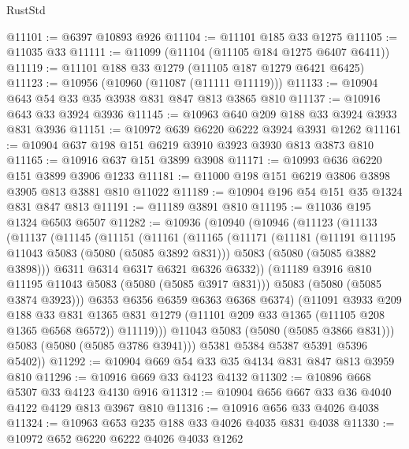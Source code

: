 \begin{lexlean}{RustStd}
\begin{coremodule}
{\begin{coremodule}
{{{{{@11101 := @6397 @10893 @926
@11104 := @11101 @185 @33 @1275
@11105 := @11035 @33
@11111 := @11099 (@11104 (@11105 @184 @1275 @6407 @6411))
@11119 := @11101 @188 @33 @1279 (@11105 @187 @1279 @6421 @6425)
@11123 := @10956 (@10960 (@11087 (@11111 @11119)))
@11133 := @10904 @643 @54 @33 @35 @3938 @831 @847 @813 @3865 @810
@11137 := @10916 @643 @33 @3924 @3936
@11145 := @10963 @640 @209 @188 @33 @3924 @3933 @831 @3936
@11151 := @10972 @639 @6220 @6222 @3924 @3931 @1262
@11161 := @10904 @637 @198 @151 @6219 @3910 @3923 @3930 @813 @3873 @810
@11165 := @10916 @637 @151 @3899 @3908
@11171 := @10993 @636 @6220 @151 @3899 @3906 @1233
@11181 := @11000 @198 @151 @6219 @3806 @3898 @3905 @813 @3881 @810 @11022
@11189 := @10904 @196 @54 @151 @35 @1324 @831 @847 @813
@11191 := @11189 @3891 @810
@11195 := @11036 @195 @1324 @6503 @6507
@11282 := @10936
    (@10940
      (@10946
        (@11123
          (@11133
            (@11137
              (@11145
                (@11151
                  (@11161
                    (@11165
                      (@11171
                        (@11181
                          (@11191 @11195 @11043 @5083 (@5080 (@5085 @3892 @831)))
                          @5083
                          (@5080 (@5085 @3882 @3898)))
                        @6311
                        @6314
                        @6317
                        @6321
                        @6326
                        @6332))
                    (@11189 @3916 @810 @11195 @11043 @5083 (@5080 (@5085 @3917 @831)))
                    @5083
                    (@5080 (@5085 @3874 @3923)))
                  @6353
                  @6356
                  @6359
                  @6363
                  @6368
                  @6374)
                (@11091
                  @3933
                  @209
                  @188
                  @33
                  @831
                  @1365
                  @831
                  @1279
                  (@11101 @209 @33 @1365 (@11105 @208 @1365 @6568 @6572))
                  @11119)))
            @11043
            @5083
            (@5080 (@5085 @3866 @831)))
          @5083
          (@5080 (@5085 @3786 @3941)))
        @5381
        @5384
        @5387
        @5391
        @5396
        @5402))
@11292 := @10904 @669 @54 @33 @35 @4134 @831 @847 @813 @3959 @810
@11296 := @10916 @669 @33 @4123 @4132
@11302 := @10896 @668 @5307 @33 @4123 @4130 @916
@11312 := @10904 @656 @667 @33 @36 @4040 @4122 @4129 @813 @3967 @810
@11316 := @10916 @656 @33 @4026 @4038
@11324 := @10963 @653 @235 @188 @33 @4026 @4035 @831 @4038
@11330 := @10972 @652 @6220 @6222 @4026 @4033 @1262
}}}}}
\end{coremodule}}
\end{coremodule}
\end{lexlean}
